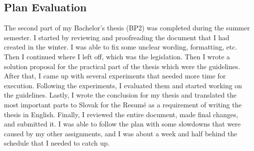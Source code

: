 \subsection*{Plan Evaluation}
The second part of my Bachelor's thesis (BP2) was completed during the summer semester. I started by reviewing and proofreading the document that I had created in the winter. I was able to fix some unclear wording, formatting, etc. Then I continued where I left off, which was the legislation. Then I wrote a solution proposal for the practical part of the thesis which were the guidelines. After that, I came up with several experiments that needed more time for execution. Following the experiments, I evaluated them and started working on the guidelines. Lastly, I wrote the conclusion for my thesis and translated the most important parts to Slovak for the Resumé as a requirement of writing the thesis in English. Finally, I reviewed the entire document, made final changes, and submitted it.
I was able to follow the plan with some slowdowns that were caused by my other assignments, and I was about a week and half behind the schedule that I needed to catch up.


\begin{refsegment}

\printbibliography[heading=referencessec,segment=\therefsegment,resetnumbers=true]

\end{refsegment}